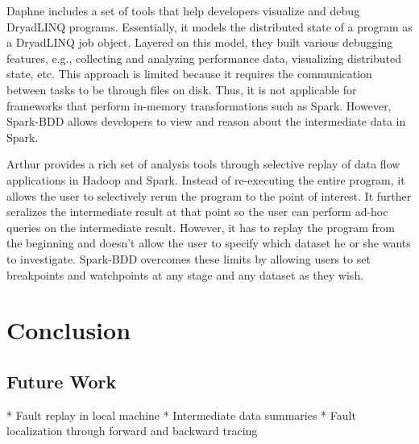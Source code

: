 \documentclass{acm_proc_article-sp}
\begin{document}
Daphne includes a set of tools that help developers visualize and debug DryadLINQ programs. Essentially, it models the distributed state of a program as a DryadLINQ job object. Layered on this model, they built various debugging features, e.g., collecting and analyzing performance data, visualizing distributed state, etc. This approach is limited because it requires the communication between tasks to be through files on disk. Thus, it is not applicable for frameworks that perform in-memory transformations such as Spark. However, Spark-BDD allows developers to view and reason about the intermediate data in Spark. 

Arthur provides a rich set of analysis tools through selective replay of data flow applications in Hadoop and Spark. Instead of re-executing the entire program, it allows the user to selectively rerun the program to the point of interest. It further seralizes the intermediate result at that point so the user can perform ad-hoc queries on the intermediate result. However, it has to replay the program from the beginning and doesn't allow the user to specify which dataset he or she wants to investigate. Spark-BDD overcomes these limits by allowing users to set breakpoints and watchpoints at any stage and any dataset as they wish.

\section{Conclusion}

\subsection{Future Work}
* Fault replay in local machine
* Intermediate data summaries
* Fault localization through forward and backward tracing


  
\balancecolumns
\end{document}
